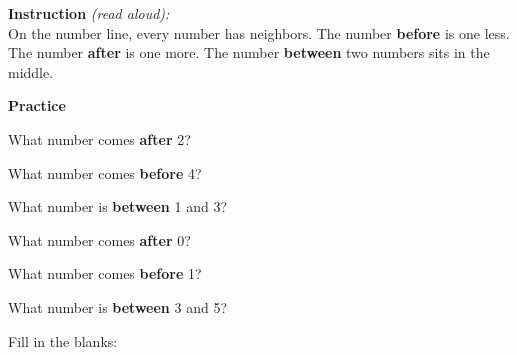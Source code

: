 \documentclass[12pt,letterpaper]{article}
\begin{document}

\begin{instructbox}
\noindent\textbf{\color{sd-blue}Instruction} \textit{(read aloud):}\\[4pt]
On the number line, every number has neighbors.
The number \textbf{before} is one less.
The number \textbf{after} is one more.
The number \textbf{between} two numbers sits in the middle.
\end{instructbox}

\vspace{6pt}
\begin{center}
\end{center}

\goldrule
\noindent\textbf{\color{sd-blue}Practice}
\vspace{6pt}

\prob What number comes \textbf{after} 2? \quad\ansblank

\vspace{8pt}
\prob What number comes \textbf{before} 4? \quad\ansblank

\vspace{8pt}
\prob What number is \textbf{between} 1 and 3? \quad\ansblank

\vspace{8pt}
\prob What number comes \textbf{after} 0? \quad\ansblank

\vspace{8pt}
\prob What number comes \textbf{before} 1? \quad\ansblank

\vspace{8pt}
\prob What number is \textbf{between} 3 and 5? \quad\ansblank

\vspace{8pt}
\prob Fill in the blanks:\\[6pt]
\hspace{1cm}\ansblank {} \quad \ansblank\\[8pt]
\hspace{1cm}\ansblank {} \quad \ansblank\\[8pt]
\hspace{1cm}\ansblank {} \quad \ansblank
\end{document}
